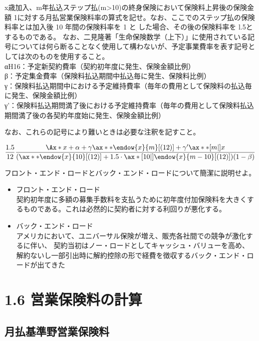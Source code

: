 \documentclass[report,gutter=10mm,fore-edge=10mm,uplatex,dvipdfmx]{jlreq}
\begin{document}
x歳加入、m年払込ステップ払(m\textgreater10)の終身保険において保険料上昇後の保険金額
1に対する月払営業保険料率の算式を記せ。なお、ここでのステップ払の保険料率とは加入後
10 年間の保険料率を 1 と した場合、その後の保険料率を l.5とするものである。
なお、二見隆著「生命保険数学（上下）」に使用されている記号については何ら断ることなく使用して構わないが、予定事業費率を表す記号としては次のものを使用すること。\\
αH16：予定新契約費率（契約初年度に発生、保険金額比例）\\
β：予定集金費率（保険料払込期間中払込毎に発生、保険料比例）\\
γ：保険料払込期間中における予定維持費率（毎年の費用として保険料の払込毎に発生、保険金額比例）\\
γ'：保険料払込期問満了後における予定維持費率（毎年の費用として保険料払込期間満了後の各契約年度始に発生、保険金額比例）

なお、これらの記号により難いときは必要な注釈を記すこと。



\[
\frac{1.5}{12}
\frac{\Ax*{x}+\alpha+\gamma \ax**{\endow{x}{m}}[(12)]+\gamma' \ax**[m|]{x}}{(\ax**{\endow{x}{10}}[(12)]+1.5\cdot\ax*[10|]{\endow{x}{m-10}}[(12)])(1-\beta)}
\]



フロント・エンド・ロードとバック・エンド・ロードについて簡潔に説明せよ。



\begin{itemize}
\tightlist
\item
  フロント・エンド・ロード\\
契約初年度に多額の募集手数料を支払うために初年度付加保険料を大きくするものである。これは必然的に契約者に対する利回りが悪化する。
\item
  バック・エンド・ロード\\
  アメリカにおいて、ユニバーサル保険が増え、販売各社間での競争が激化するに伴い、
契約当初はノー・ロードとしてキャッシュ・バリューを高め、解約ないし一部引出時に解約控除の形で経費を徴収するバック・エンド・ロードが出てきた
  
\end{itemize}


\section{1.6
営業保険料の計算}

\subsection{月払基準野営業保険料}
\end{document}

